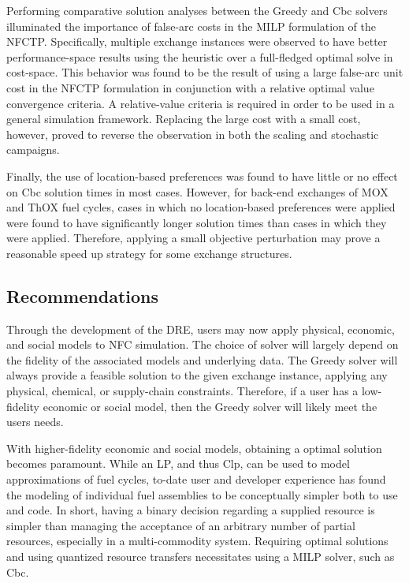 Performing comparative solution analyses between the Greedy and Cbc solvers
illuminated the importance of false-arc costs in the MILP formulation of the
NFCTP. Specifically, multiple exchange instances were observed to have better
performance-space results using the heuristic over a full-fledged optimal solve
in cost-space. This behavior was found to be the result of using a large
false-arc unit cost in the NFCTP formulation in conjunction with a relative
optimal value convergence criteria. A relative-value criteria is required in
order to be used in a general simulation framework. Replacing the large cost
with a small cost, however, proved to reverse the observation in both the
scaling and stochastic campaigns. 

Finally, the use of location-based preferences was found to have little or no
effect on Cbc solution times in most cases. However, for back-end exchanges of
MOX and ThOX fuel cycles, cases in which no location-based preferences were
applied were found to have significantly longer solution times than cases in
which they were applied. Therefore, applying a small objective perturbation may
prove a reasonable speed up strategy for some exchange structures.

\subsection{Recommendations}

Through the development of the DRE, users may now apply physical, economic, and
social models to NFC simulation. The choice of solver will largely depend on the
fidelity of the associated models and underlying data. The Greedy solver will
always provide a feasible solution to the given exchange instance, applying any
physical, chemical, or supply-chain constraints. Therefore, if a user has a
low-fidelity economic or social model, then the Greedy solver will likely meet
the users needs.

With higher-fidelity economic and social models, obtaining a optimal solution
becomes paramount. While an LP, and thus Clp, can be used to model
approximations of fuel cycles, to-date user and developer experience has found
the modeling of individual fuel assemblies to be conceptually simpler both to
use and code. In short, having a binary decision regarding a supplied resource
is simpler than managing the acceptance of an arbitrary number of partial
resources, especially in a multi-commodity system. Requiring optimal solutions
and using quantized resource transfers necessitates using a MILP solver, such as
Cbc.

